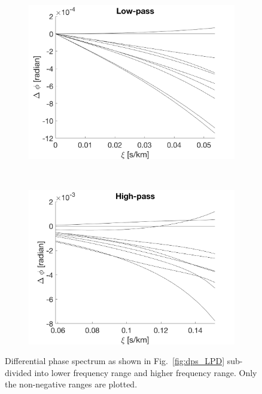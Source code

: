 \begin{figure}[tbp]	
    \begin{subfigure}[b]{0.49\textwidth}
        \includegraphics[width=\textwidth]{./Figures/Methods/LPD4-Relative_phase_angle_L.png}
    \end{subfigure}
	~
    \begin{subfigure}[b]{0.49\textwidth}
        \includegraphics[width=\textwidth]{./Figures/Methods/LPD4-Relative_phase_angle_H.png}
    \end{subfigure}	
    
    \caption[Low-pass and high-pass filters]
    {Differential phase spectrum as shown in Fig.~\ref{fig:dps_LPD} sub-divided into lower frequency range and higher frequency range. Only the non-negative ranges are plotted.}
\label{fig:low-high-pass_lpd}
\end{figure}    

